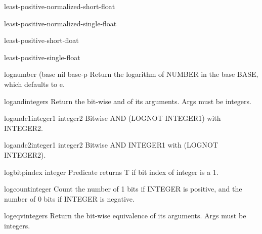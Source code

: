 \begin{constant}{least-positive-normalized-short-float}{}{}
  
\end{constant}

\begin{constant}{least-positive-normalized-single-float}{}{}
  
\end{constant}

\begin{constant}{least-positive-short-float}{}{}
  
\end{constant}

\begin{constant}{least-positive-single-float}{}{}
  
\end{constant}

\begin{function}{log}{number \op (base nil base-p}{}
  Return the logarithm of NUMBER in the base BASE, which defaults to e.
\end{function}

\begin{function}{logand}{\rest integers}{}
  Return the bit-wise and of its arguments. Args must be integers.
\end{function}

\begin{function}{logandc1}{integer1 integer2}{}
  Bitwise AND (LOGNOT INTEGER1) with INTEGER2.
\end{function}

\begin{function}{logandc2}{integer1 integer2}{}
  Bitwise AND INTEGER1 with (LOGNOT INTEGER2).
\end{function}

\begin{function}{logbitp}{index integer}{}
  Predicate returns T if bit index of integer is a 1.
\end{function}

\begin{function}{logcount}{integer}{}
  Count the number of 1 bits if INTEGER is positive, and the number of 0 bits
  if INTEGER is negative.
\end{function}

\begin{function}{logeqv}{\rest integers}{}
  Return the bit-wise equivalence of its arguments. Args must be integers.
\end{function}

